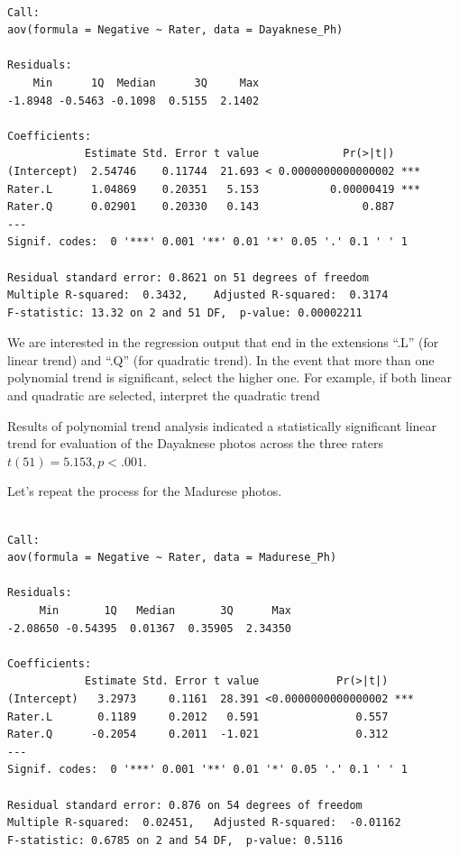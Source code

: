\documentclass[
  11pt,
]{book}
\newenvironment{Shaded}{\begin{snugshade}}{\end{snugshade}}
\newcommand{\AttributeTok}[1]{\textcolor[rgb]{0.27,0.27,0.27}{#1}}
\newcommand{\DecValTok}[1]{\textcolor[rgb]{0.06,0.06,0.06}{#1}}
\newcommand{\FunctionTok}[1]{\textcolor[rgb]{0.27,0.27,0.27}{\textbf{#1}}}
\newcommand{\NormalTok}[1]{#1}
\newcommand{\OtherTok}[1]{\textcolor[rgb]{0.37,0.37,0.37}{#1}}
\newcommand{\SpecialCharTok}[1]{\textcolor[rgb]{0.43,0.43,0.43}{\textbf{#1}}}
\begin{document}
\begin{verbatim}

Call:
aov(formula = Negative ~ Rater, data = Dayaknese_Ph)

Residuals:
    Min      1Q  Median      3Q     Max 
-1.8948 -0.5463 -0.1098  0.5155  2.1402 

Coefficients:
            Estimate Std. Error t value             Pr(>|t|)    
(Intercept)  2.54746    0.11744  21.693 < 0.0000000000000002 ***
Rater.L      1.04869    0.20351   5.153           0.00000419 ***
Rater.Q      0.02901    0.20330   0.143                0.887    
---
Signif. codes:  0 '***' 0.001 '**' 0.01 '*' 0.05 '.' 0.1 ' ' 1

Residual standard error: 0.8621 on 51 degrees of freedom
Multiple R-squared:  0.3432,    Adjusted R-squared:  0.3174 
F-statistic: 13.32 on 2 and 51 DF,  p-value: 0.00002211
\end{verbatim}

We are interested in the regression output that end in the extensions ``.L'' (for linear trend) and ``.Q'' (for quadratic trend). In the event that more than one polynomial trend is significant, select the higher one. For example, if both linear and quadratic are selected, interpret the quadratic trend

Results of polynomial trend analysis indicated a statistically significant linear trend for evaluation of the Dayaknese photos across the three raters \(t(51) = 5.153, p < .001\).

Let's repeat the process for the Madurese photos.

\begin{Shaded}
\end{Shaded}

\begin{verbatim}

Call:
aov(formula = Negative ~ Rater, data = Madurese_Ph)

Residuals:
     Min       1Q   Median       3Q      Max 
-2.08650 -0.54395  0.01367  0.35905  2.34350 

Coefficients:
            Estimate Std. Error t value            Pr(>|t|)    
(Intercept)   3.2973     0.1161  28.391 <0.0000000000000002 ***
Rater.L       0.1189     0.2012   0.591               0.557    
Rater.Q      -0.2054     0.2011  -1.021               0.312    
---
Signif. codes:  0 '***' 0.001 '**' 0.01 '*' 0.05 '.' 0.1 ' ' 1

Residual standard error: 0.876 on 54 degrees of freedom
Multiple R-squared:  0.02451,   Adjusted R-squared:  -0.01162 
F-statistic: 0.6785 on 2 and 54 DF,  p-value: 0.5116
\end{verbatim}
\end{document}
